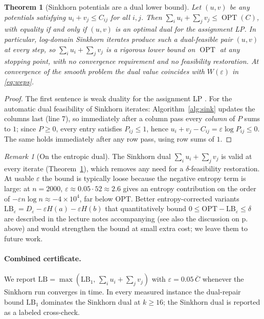 \documentclass[11pt]{article}
\newtheorem{theorem}{Theorem}
\theoremstyle{remark}
\newtheorem{remark}{Remark}
\begin{document}
\begin{theorem}[Sinkhorn potentials are a dual lower bound]
\label{thm:ent}
Let $(u,v)$ be \emph{any} potentials satisfying $u_i+v_j\le C_{ij}$ for all
$i,j$. Then $\sum_i u_i+\sum_j v_j\le \operatorname{OPT}(C)$, with equality
if and only if $(u,v)$ is an optimal dual for the assignment LP.
In particular, log-domain Sinkhorn iterates produce such a dual-feasible
pair $(u,v)$ at \emph{every} step, so $\sum_i u_i+\sum_j v_j$ is a rigorous
lower bound on $\operatorname{OPT}$ at any stopping point, with no
convergence requirement and no feasibility restoration. At convergence of
the smooth problem the dual value coincides with $W(\varepsilon)$ in
\eqref{eq:weps}.
\end{theorem}
\begin{proof}
The first sentence is weak duality for the assignment LP
\cite{schrijver2003}. For the automatic dual feasibility of Sinkhorn
iterates: Algorithm~\ref{alg:sink} updates the columns last (line 7), so
immediately after a column pass every \emph{column} of $P$ sums to $1$;
since $P\ge 0$, every entry satisfies $P_{ij}\le 1$, hence
$u_i+v_j-C_{ij}=\varepsilon\log P_{ij}\le 0$. The same holds immediately
after any row pass, using row sums of $1$.
\end{proof}

\begin{remark}[On the entropic dual]
\label{rem:num}
The Sinkhorn dual $\sum_i u_i+\sum_j v_j$ is valid at every iterate
(Theorem~\ref{thm:ent}), which removes any need for a $\delta$-feasibility
restoration. At usable $\varepsilon$ the bound is typically loose because
the negative entropy term is large: at $n=2000$, $\varepsilon\approx 0.05\cdot 52\approx 2.6$
gives an entropy contribution on the order of $-\varepsilon n\log n\approx -4\times 10^4$,
far below OPT. Better entropy-corrected variants
$\mathrm{LB}_{\varepsilon}=D_{\varepsilon}-\varepsilon H(a)-\varepsilon H(b)$
that quantitatively bound $0\le\mathrm{OPT}-\mathrm{LB}_{\varepsilon}\le\delta$
are described in the lecture notes accompanying \cite{peyre2019}
(see also the discussion on p.~\pageref{pg:clip} above) and would
strengthen the bound at small extra cost; we leave them to future work.
\end{remark}

\paragraph{Combined certificate.} We report
$\mathrm{LB}=\max(\mathrm{LB}_1,\, \sum_i u_i+\sum_j v_j)$ with
$\varepsilon=0.05\,\overline{C}$ whenever the Sinkhorn run converges in
time. In every measured instance the dual-repair bound $\mathrm{LB}_1$
dominates the Sinkhorn dual at $k\ge 16$; the Sinkhorn dual is reported
as a labeled cross-check.
\end{document}

